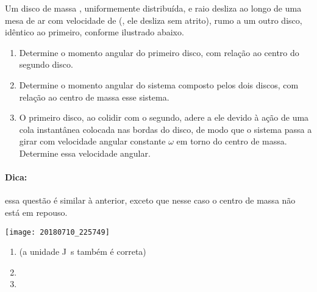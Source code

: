 \begin{question}
    Um disco de massa , uniformemente distribuída, e raio  desliza ao longo de uma mesa de ar com velocidade de  (\ie, ele desliza sem atrito), rumo a um outro disco, idêntico ao primeiro, conforme ilustrado abaixo.
    \begin{enumerate}
      \item Determine o momento angular do primeiro disco, com relação ao centro do segundo disco.
      \item Determine o momento angular do sistema composto pelos dois discos, com relação ao centro de massa esse sistema.
      \item O primeiro disco, ao colidir com o segundo, adere a ele devido à ação de uma cola instantânea colocada nas bordas do disco, de modo que o sistema passa a girar com velocidade angular constante $\omega$ em torno do centro de massa.
      Determine essa velocidade angular.
    \end{enumerate}

    \paragraph{Dica:} essa questão é similar à anterior, exceto que nesse caso o centro de massa não está em repouso.

    \begin{center}
      \texttt{[image: 20180710\_225749]}
    \end{center}

    \begin{answer}
      \begin{enumerate}
        \item {} (a unidade \unit{J.s} também é correta)
        \item {}
        \item {}
      \end{enumerate}
    \end{answer}
    

\end{question}
